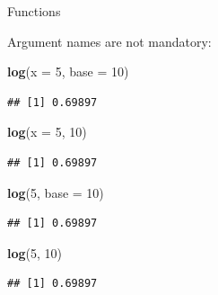 \documentclass[ignorenonframetext,]{beamer}
\newenvironment{Shaded}{\begin{snugshade}}{\end{snugshade}}
\newcommand{\DataTypeTok}[1]{\textcolor[rgb]{0.13,0.29,0.53}{#1}}
\newcommand{\DecValTok}[1]{\textcolor[rgb]{0.00,0.00,0.81}{#1}}
\newcommand{\KeywordTok}[1]{\textcolor[rgb]{0.13,0.29,0.53}{\textbf{#1}}}
\newcommand{\NormalTok}[1]{#1}
\begin{document}
\begin{frame}[fragile]{Functions}
\protect\hypertarget{functions-5}{}

Argument names are not mandatory:

\begin{Shaded}
\begin{Highlighting}[]
\KeywordTok{log}\NormalTok{(}\DataTypeTok{x =} \DecValTok{5}\NormalTok{, }\DataTypeTok{base =} \DecValTok{10}\NormalTok{)}
\end{Highlighting}
\end{Shaded}

\begin{verbatim}
## [1] 0.69897
\end{verbatim}

\begin{Shaded}
\begin{Highlighting}[]
\KeywordTok{log}\NormalTok{(}\DataTypeTok{x =} \DecValTok{5}\NormalTok{, }\DecValTok{10}\NormalTok{)}
\end{Highlighting}
\end{Shaded}

\begin{verbatim}
## [1] 0.69897
\end{verbatim}

\begin{Shaded}
\begin{Highlighting}[]
\KeywordTok{log}\NormalTok{(}\DecValTok{5}\NormalTok{, }\DataTypeTok{base =} \DecValTok{10}\NormalTok{)}
\end{Highlighting}
\end{Shaded}

\begin{verbatim}
## [1] 0.69897
\end{verbatim}

\begin{Shaded}
\begin{Highlighting}[]
\KeywordTok{log}\NormalTok{(}\DecValTok{5}\NormalTok{, }\DecValTok{10}\NormalTok{)}
\end{Highlighting}
\end{Shaded}

\begin{verbatim}
## [1] 0.69897
\end{verbatim}

\end{frame}
\end{document}
